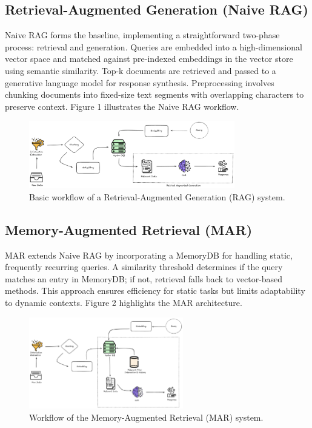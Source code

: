 \documentclass[pdflatex,sn-mathphys-num]{sn-jnl}%
\begin{document}
\subsection{Retrieval-Augmented Generation (Naive RAG)}\label{subsec2}
Naive RAG forms the baseline, implementing a straightforward two-phase process: retrieval and generation. Queries are embedded into a high-dimensional vector space and matched against pre-indexed embeddings in the vector store using semantic similarity. Top-k documents are retrieved and passed to a generative language model for response synthesis. Preprocessing involves chunking documents into fixed-size text segments with overlapping characters to preserve context. Figure 1 illustrates the Naive RAG workflow.

\begin{figure}[h]
    \centering
    \includegraphics[width=0.8\textwidth]{Basic_Rag.eps}
    \caption{Basic workflow of a Retrieval-Augmented Generation (RAG) system.}
    \label{fig:rag_pipeline}
\end{figure}


\subsection{Memory-Augmented Retrieval (MAR)}\label{subsec2}
MAR extends Naive RAG by incorporating a MemoryDB for handling static, frequently recurring queries. A similarity threshold determines if the query matches an entry in MemoryDB; if not, retrieval falls back to vector-based methods. This approach ensures efficiency for static tasks but limits adaptability to dynamic contexts. Figure 2 highlights the MAR architecture.

\begin{figure}[h]
    \centering
    \includegraphics[width=0.6\textwidth]{MAR_rag.eps}
    \caption{Workflow of the Memory-Augmented Retrieval (MAR) system.}
    \label{fig:mar_pipeline}
\end{figure}    
\end{document}
